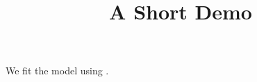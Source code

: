 \documentclass[article]{jss}
\title{A Short Demo}
\begin{document}
We fit the model using  \citep{Wood:2006}.
\end{document}

